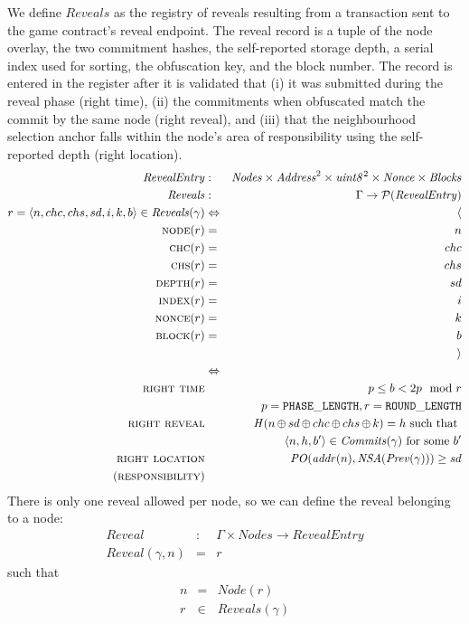 \begin{definition}
\label{def:reveals}
We define $\mathit{Reveals}$ as the registry of reveals resulting from a transaction sent to the game contract's reveal endpoint. The reveal record is a tuple of the node overlay, the two commitment hashes, the self-reported storage depth, a serial index used for sorting, the obfuscation key, and the block number. The record is entered in the register after it is validated that (i) it was submitted during the reveal phase (right time), (ii) the commitments when obfuscated match the commit by the same node (right reveal), and (iii) that the neighbourhood selection anchor falls within the node's area of responsibility using the self-reported depth (right location). 
%
\begin{eqnarray}
\mathit{RevealEntry}&:&\mathit{Nodes}\times\mathit{Address}^2\times\mathit{uint8}^2\times\mathit{Nonce}\times\mathit{Blocks}\\
\mathit{Reveals}&:&\Gamma\to\mathcal{P}(\mathit{RevealEntry})\\
r=\langle n,chc,chs,sd,i,k,b\rangle\in\mathit{Reveals}(\gamma)&\Leftrightarrow& 
\langle\\
\textsc{node}(r)&=&n\\
\textsc{chc}(r)&=&chc\\
\textsc{chs}(r)&=&chs\\
\textsc{depth}(r)&=&sd\\
\textsc{index}(r)&=&i\\
\textsc{nonce}(r)&=&k\\
\textsc{block}(r)&=&b\\
&&\rangle\\
&\Leftrightarrow&\\
\textsc{right time}
&&p \leq b < 2p \mod r\\
&& p = \mathtt{PHASE\_LENGTH}, r= \mathtt{ROUND\_LENGTH} \\
\textsc{right reveal}&&\mathit{H}(n\operatorname{\operatorname{\oplus}} sd\operatorname{\operatorname{\oplus}} chc\operatorname{\operatorname{\oplus}} chs\operatorname{\operatorname{\oplus}} k)=h \text{ such that }\\
&&\langle n,h,b'\rangle\in\mathit{Commits}(\gamma)\text{ for some }b'\\
\textsc{right location}&&\mathit{PO}(\mathit{addr}(n),\mathit{NSA}(\mathit{Prev}(\gamma)))\geq sd\\
(\textsc{responsibility})&&
\end{eqnarray}
%
There is only one reveal allowed per node, so we can define the reveal belonging to a node:
%
\begin{eqnarray}
\mathit{Reveal}&:&\Gamma\times\mathit{Nodes}\to\mathit{RevealEntry}\\
\mathit{Reveal}(\gamma, n)&=&r
\end{eqnarray}
such that 
\begin{eqnarray}
n&=&\mathit{Node}(r)\\
r&\in&\mathit{Reveals}(\gamma)
\end{eqnarray}
\end{definition}

